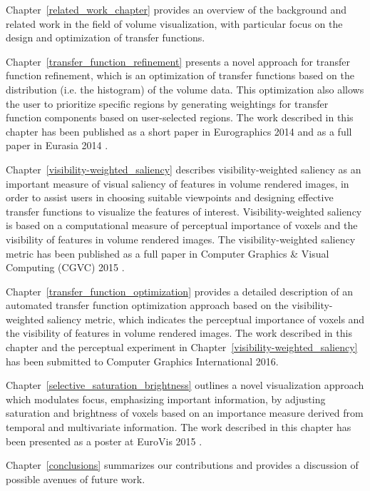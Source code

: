 Chapter~\ref{related_work_chapter}
provides an overview of the background and related work in the field of volume visualization, with particular focus on the design and optimization of transfer functions.

Chapter~\ref{transfer_function_refinement}
presents a novel approach for transfer function refinement, which is an optimization of transfer functions based on the distribution (i.e. the histogram) of the volume data. This optimization also allows the user to prioritize specific regions by generating weightings for transfer function components based on user-selected regions. The work described in this chapter has been published as a short paper in Eurographics 2014 \cite{luo_information-guided_2014} and as a full paper in Eurasia 2014 \cite{shengzhou_luo_transfer_2014}.

Chapter~\ref{visibility-weighted_saliency}
describes visibility-weighted saliency as an important measure of visual saliency of features in volume rendered images, in order to assist users in choosing suitable viewpoints and designing effective transfer functions to visualize the features of interest. Visibility-weighted saliency is based on a computational measure of perceptual importance of voxels and the visibility of features in volume rendered images. The visibility-weighted saliency metric has been published as a full paper in Computer Graphics \& Visual Computing (CGVC) 2015 \cite{borgo_visibility-weighted_2015}.

Chapter~\ref{transfer_function_optimization}
provides a detailed description of an automated transfer function optimization approach based on the visibility-weighted saliency metric, which indicates the perceptual importance of voxels and the visibility of features in volume rendered images. The work described in this chapter and the perceptual experiment in Chapter~\ref{visibility-weighted_saliency} has been submitted to Computer Graphics International 2016.

Chapter~\ref{selective_saturation_brightness}
outlines a novel visualization approach which modulates focus, emphasizing important information, by adjusting saturation and brightness of voxels based on an importance measure derived from temporal and multivariate information. The work described in this chapter has been presented as a poster at EuroVis 2015 \cite{shengzhou_luo_selective_2015}.

Chapter~\ref{conclusions}
summarizes our contributions and provides a discussion of possible avenues of future work.

%
%

